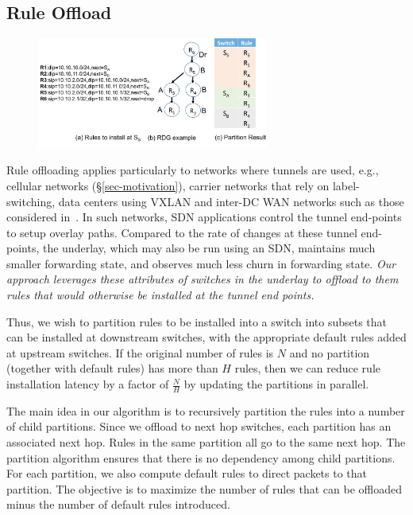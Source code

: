 \subsection{Rule Offload}
\label{s:offload}

\begin{figure}
\centering
  \centering
  \includegraphics[width=3.0in]{figs/Rule-Offload2.pdf}
\label{fig:rule-offload}
\end{figure}


Rule offloading applies particularly to networks where tunnels are
used, e.g., cellular networks (\S\ref{sec-motivation}), carrier networks
that rely on label-switching, data centers using VXLAN
and inter-DC WAN networks such as those considered
in~\cite{swan,b4}. In such networks, SDN applications
control the tunnel end-points to setup overlay paths. Compared to the rate of
changes at these tunnel end-points, the underlay, which may also be
run using an SDN, maintains much smaller forwarding state, and
observes much less churn in forwarding state. {\em Our approach
  leverages these attributes of switches in the underlay to offload to
  them rules that would otherwise be installed at the tunnel end
  points.} 

Thus, we wish to partition rules to be installed into a switch into
subsets that can be installed at downstream switches, with the appropriate
default rules added at upstream switches. If the original number of rules is $N$
and no partition (together with default rules) has more than $H$ rules, then we can
reduce rule installation latency by a factor of $\frac{N}{H}$ by updating the
partitions in parallel. 

The main idea in our algorithm is to recursively partition the rules into a
number of child partitions. Since we offload to next hop switches, each
partition has an associated next hop. Rules in
the same partition all go to the same next hop.   
The partition algorithm ensures that there is no dependency among child
partitions. For each partition, we also compute default rules to
direct packets to that partition. The objective is to maximize the number of
rules that can be offloaded minus the number of default rules introduced. 

